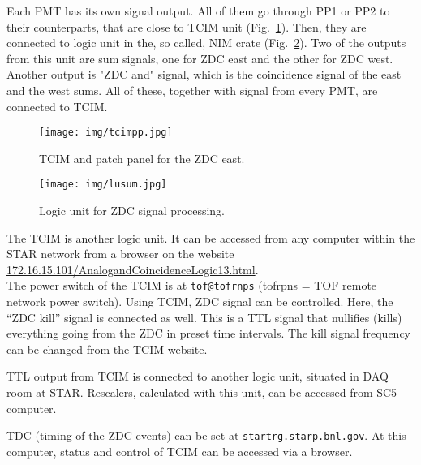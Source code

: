Each PMT has its own signal output. All of them go through PP1 or PP2 to their counterparts, that are close to TCIM unit (Fig.~\ref{tcimpp}). Then, they are connected to logic unit in the, so called, NIM crate (Fig.~\ref{lu_sum}). Two of the outputs from this unit are sum signals, one for ZDC east and the other for ZDC west. Another output is "ZDC and" signal, which is the coincidence signal of the east and the west sums. All of these, together with signal from every PMT, are connected to TCIM.

\begin{figure}[htb]
\begin{center}
\texttt{[image: img/tcimpp.jpg]}
\end{center}
\caption{TCIM and patch panel for the ZDC east.}
\label{tcimpp}
\end{figure}


\begin{figure}[htb]
\begin{center}
\texttt{[image: img/lusum.jpg]}
\end{center}
\caption{Logic unit for ZDC signal processing.}
\label{lu_sum}
\end{figure}

The TCIM is another logic unit.  It can be accessed from any  computer within the STAR network
from a browser on the website\\ 
\url{172.16.15.101/AnalogandCoincidenceLogic13.html}.\\
The power switch of the TCIM is at \texttt{tof@tofrnps} (tofrpns = TOF remote network power switch).
Using TCIM, ZDC signal can be controlled. Here, the ``ZDC kill'' signal is connected as well. This is a TTL signal that nullifies (kills) everything going from the ZDC in preset time intervals. The
kill signal frequency can be changed from the TCIM website.

TTL output from TCIM is connected to another logic unit, situated in DAQ room at STAR\@. Rescalers, calculated with this unit, can be accessed from SC5 computer.

TDC (timing of the ZDC events) can be set at \texttt{startrg.starp.bnl.gov}. At this computer, status and control of TCIM can be accessed via a browser.

